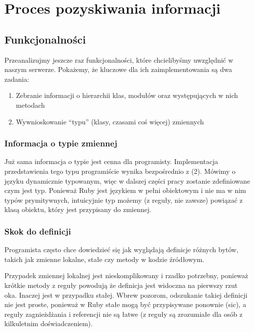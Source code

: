 \documentclass[shortabstract,mgr]{iithesis}
\begin{document}
\section{Proces pozyskiwania informacji}

\subsection{Funkcjonalności}

Przeanalizujmy jeszcze raz funkcjonalności, które chcielibyśmy uwzględnić w naszym serwerze. Pokażemy, że kluczowe  dla ich zaimplementowania są dwa zadania:
\begin{enumerate}
\item Zebranie informacji o hierarchii klas, modułów oraz występujących w nich metodach
\item Wywnioskowanie ``typu'' (klasy, czasami coś więcej) zmiennych
\end{enumerate}

\subsubsection{Informacja o typie zmiennej}

Już sama informacja o typie jest cenna dla programisty. Implementacja przedstawienia tego typu programiście wynika bezpośrednio z (2).
Mówimy o języku dynamicznie typowanym, więc w dalszej części pracy zostanie zdefiniowane czym jest typ. Ponieważ Ruby jest językiem w pełni obiektowym i nie ma w nim typów prymitywnych, intuicyjnie typ możemy (z reguły, nie zawsze) powiązać z klasą obiektu, który jest przypisany do zmiennej.

\subsubsection{Skok do definicji}

Programista często chce dowiedzieć się jak wyglądają definicje różnych bytów, takich jak zmienne lokalne, stałe czy metody w kodzie źródłowym.

Przypadek zmiennej lokalnej jest nieskomplikowany i rzadko potrzebny, ponieważ krótkie metody z reguły powodują że definicja jest widoczna na pierwszy rzut oka. Inaczej jest w przypadku stałej. Wbrew pozorom, odszukanie takiej definicji nie jest proste, ponieważ w Ruby stałe mogą być przypisywane ponownie (sic), a reguły zagnieżdżania i referencji nie są łatwe (z reguły są zrozumiałe dla osób z kilkuletnim doświadczeniem).
\end{document}
